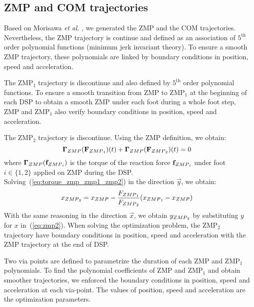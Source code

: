 \documentclass[journal]{IEEEtran}
\begin{document}
\subsection{ZMP and COM trajectories}
Based on Morisawa \textit{et al.} \cite{morisawa:humanoids:2006}, we generated the ZMP and the COM trajectories. Nevertheless, the ZMP trajectory is continue and defined as an association of $5^{\text{th}}$ order polynomial functions (minimum jerk invariant theory). To ensure a smooth ZMP trajectory, these polynomials are linked by boundary conditions in position, speed and acceleration.

The ZMP$_1$ trajectory is discontinue and also defined by  $5^{\text{th}}$ order polynomial functions. To ensure a smooth transition from ZMP to ZMP$_1$ at the beginning of each DSP to obtain a smooth ZMP under each foot during a whole foot step, ZMP and ZMP$_1$ also verify boundary conditions in position, speed and acceleration.

The ZMP$_2$ trajectory is discontinue. Using the ZMP definition, we obtain:
\begin{equation}
\label{eq:torque_zmp_zmp1_zmp2}
\mathbf{\Gamma}_{\mbox{\tiny ZMP}}(\mathbf{F}_{\mbox{\tiny ZMP}_1})(t)+\mathbf{\Gamma}_{\mbox{\tiny ZMP}}(\mathbf{F}_{\mbox{\tiny ZMP}_2})(t)=0
\end{equation}
where $\mathbf{\Gamma}_{\mbox{\tiny ZMP}}(\mathbf{f}_{{\mbox{\tiny ZMP}}_{i}})$ is the torque of the reaction force $\mathbf{f}_{{\mbox{\tiny ZMP}}_{i}}$ under foot $i\in\{1,2\}$ applied on ZMP during the DSP. Solving~(\ref{eq:torque_zmp_zmp1_zmp2}) in the direction $\vec{y}$, we obtain:
\begin{equation}
\label{eq:zmp2}
x_{\mbox{\tiny ZMP}_2}=x_{\mbox{\tiny ZMP}}-\dfrac{F_{\mbox{\tiny ZMP}_1}}{F_{\mbox{\tiny ZMP}_2}}(x_{\mbox{\tiny ZMP}_1}-x_{\mbox{\tiny ZMP}})
\end{equation}
With the same reasoning in the direction $\vec{x}$, we obtain $y_{\mbox{\tiny ZMP}_2}$ by substituting $y$ for $x$ in~(\ref{eq:zmp2}).
When solving the optimization problem, the ZMP$_2$ trajectory have boundary conditions in position, speed and acceleration with the ZMP trajectory at the end of DSP.

Two via points are defined to parametrize the duration of each ZMP and ZMP$_1$ polynomials. To find the polynomial coefficients of ZMP and ZMP$_1$ and obtain smoother trajectories, we enforced the boundary conditions in position, speed and acceleration at each via-point. The values of position, speed and acceleration are the optimization parameters.
\end{document}
